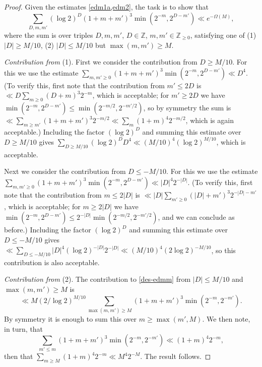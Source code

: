 \documentclass[11pt,reqno]{amsart}
\numberwithin{equation}{section}
\theoremstyle{definition}
\theoremstyle{remark}
\renewcommand{\le}{\leqslant}
\renewcommand{\ge}{\geqslant}
\newcommand\Z{\mathbb{Z}}
\begin{document}
\begin{proof} Given the estimates \cref{edm1a,edm2}, the task is to show that 
\begin{equation} \label{des-edmm}\sum_{D,m,m'} (\log 2)^D (1 + m + m')^3 \min (2^{-m}, 2^{D - m'}) \ll e^{-\Omega(M)},\end{equation}
where the sum is over triples $D,m, m'$, $D \in \Z$, $m, m' \in \Z_{\ge 0}$, satisfying one of (1) $|D| \ge M/10$, (2) $|D| \le M/10$ but $\max(m,m') \ge M$. \vspace*{8pt}

\emph{Contribution from} (1). First we consider the contribution from $D \ge M/10$. For this we use the estimate $\sum_{m,m' \ge 0} (1 + m + m')^{3} \min( 2^{-m}, 2^{D - m'}) \ll D^{4}$. (To verify this, first note that the contribution from $m' \le 2D$ is $\ll D\sum_{m \ge 0} (D + m)^{3} 2^{-m}$, which is acceptable; for $m' \ge 2D$ we have $\min (2^{-m}, 2^{D - m'}) \le \min (2^{-m/2}, 2^{-m'/2})$, so by symmetry the sum is $\ll \sum_{m \ge m'} (1 + m + m')^{3} 2^{-m/2} \ll \sum_{m} (1 + m)^{4} 2^{-m/2}$, which is again acceptable.) Including the factor $(\log 2)^D$ and summing this estimate over $D \ge M/10$ gives $\sum_{D \ge M/10} (\log 2)^D D^{4} \ll (M/10)^{4} (\log 2)^{M/10}$, which is acceptable.

Next we consider the contribution from $D \le -M/10$. For this we use the estimate $\sum_{m, m' \ge 0} (1 + m + m')^{3} \min(2^{-m}, 2^{D - m'}) \ll |D|^{4} 2^{-|D|}$. (To verify this, first note that the contribution from $m \le 2|D|$ is $\ll |D|\sum_{m' \ge 0} (|D| + m')^{3} 2^{-|D| - m'}$, which is acceptable; for $m \ge 2|D|$ we have $\min(2^{-m}, 2^{D - m'}) \le 2^{-|D|} \min(2^{-m/2}, 2^{-m'/2})$, and we can conclude as before.) Including the factor $(\log 2)^D$ and summing this estimate over $D \le -M/10$ gives $\ll \sum_{D \le -M/10} |D|^{4}(\log 2)^{-|D|} 2^{-|D|} \ll (M/10)^{4}(2 \log 2)^{-M/10}$, so this contribution is also acceptable.\vspace*{8pt}

\emph{Contribution from} (2). The contribution to \cref{des-edmm} from $|D| \le M/10$ and $\max(m,m') \ge M$ is
\[ \ll M (2/\log 2)^{M/10} \sum_{\max(m,m') \ge M}(1 + m + m')^{3} \min(2^{-m}, 2^{- m'}).\]
By symmetry it is enough to sum this over $m \ge \max(m', M)$. We then note, in turn, that 
\[ \sum_{m' \le m} (1 + m + m')^{3} \min(2^{-m}, 2^{-m'}) \ll (1 + m)^{4} 2^{-m},\] then that $\sum_{m \ge M}  (1 + m)^{4} 2^{-m} \ll M^{4} 2^{-M}$.  The result follows.
\end{proof}
\end{document}
